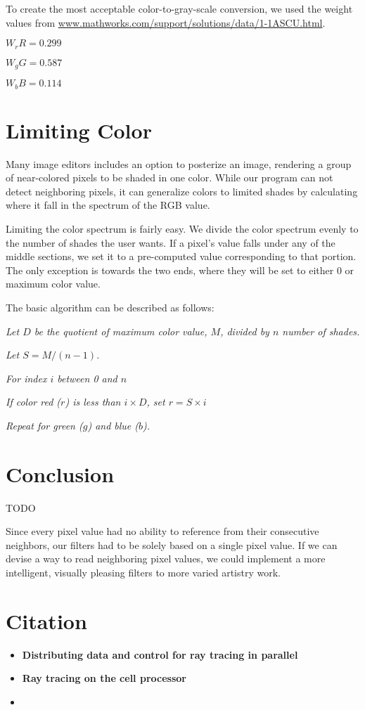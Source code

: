 \documentclass{acmsiggraph}
\begin{document}
To create the most acceptable color-to-gray-scale conversion, we used
the weight values from
\url{www.mathworks.com/support/solutions/data/1-1ASCU.html}.

$W_{r}R = 0.299$

$W_{g}G = 0.587$

$W_{b}B = 0.114$


\section*{Limiting Color}
Many image editors includes an option to posterize an image, rendering
a group of near-colored pixels to be shaded in one color.  While our program
can not detect neighboring pixels, it can generalize colors to limited shades
by calculating where it fall in the spectrum of the RGB value.

Limiting the color spectrum is fairly easy.  We divide the color spectrum evenly to
the number of shades the user wants.  If a pixel's value falls under any of the middle
sections, we set it to a pre-computed value corresponding to that portion.  The only
exception is towards the two ends, where they will be set to either 0 or maximum color
value.

The basic algorithm can be described as follows:

\textit{Let $D$ be the quotient of maximum color value, $M$, divided by $n$ number of shades.}

\textit{Let $S = M / (n - 1)$.}

\textit{For index $i$ between 0 and $n$}

\hspace{10 mm} \textit{If color red ($r$) is less than $i \times D$, set $r = S \times i$ }

\textit{Repeat for green ($g$) and blue ($b$).}


\section{Conclusion}
TODO

Since every pixel value had no ability to reference from their consecutive neighbors,
our filters had to be solely based on a single pixel value.  If we can devise a way to
read neighboring pixel values, we could implement a more intelligent, visually pleasing
filters to more varied artistry work.


\section{Citation}

\begin{itemize}
\item
\textbf{Distributing data and control for ray tracing in parallel} \cite{badouel1994dda}
\item
\textbf{Ray tracing on the cell processor} \cite{benthin2006rtc}
\item
\end{itemize}



\end{document}
